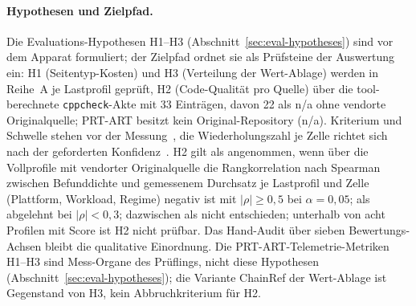 \begin{nurkurz}
\paragraph{Hypothesen und Zielpfad.} Die Evaluations-Hypothesen H1--H3 (Abschnitt~\ref{sec:eval-hypotheses})
sind vor dem Apparat formuliert; der Zielpfad ordnet sie als Prüfsteine der Auswertung ein: H1
(Seitentyp-Kosten) und H3 (Verteilung der
Wert-Ablage) werden in Reihe~A je Lastprofil geprüft, H2 (Code-Qualität pro Quelle) über die tool-berechnete
\texttt{cppcheck}-Akte mit 33 Einträgen, davon 22 als n/a ohne vendorte Originalquelle; PRT-ART besitzt kein
Original-Repository (n/a). Kriterium und Schwelle stehen vor der Messung~\cite{wohlin2012experimentation},
die Wiederholungszahl je Zelle richtet sich nach der geforderten Konfidenz~\cite{kalibera2013rigorous}.
H2 gilt als angenommen, wenn über die Vollprofile mit vendorter Originalquelle die Rangkorrelation nach
Spearman zwischen Befunddichte und gemessenem Durchsatz je Lastprofil und Zelle (Plattform, Workload,
Regime) negativ ist mit $|\rho| \geq 0{,}5$ bei $\alpha = 0{,}05$; als abgelehnt bei $|\rho| < 0{,}3$;
dazwischen als nicht entschieden; unterhalb von acht Profilen mit Score ist H2 nicht prüfbar. Das
Hand-Audit über sieben Bewertungs-Achsen bleibt die qualitative Einordnung. Die PRT-ART-Telemetrie-Metriken
H1--H3 sind Mess-Organe des Prüflings, nicht diese Hypothesen (Abschnitt~\ref{sec:eval-hypotheses}); die
Variante ChainRef der Wert-Ablage ist Gegenstand von H3, kein Abbruchkriterium für H2.
\end{nurkurz}

